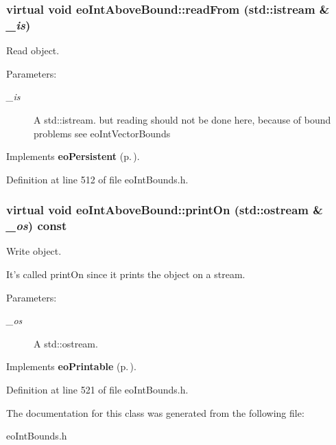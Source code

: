 \subsubsection{\setlength{\rightskip}{0pt plus 5cm}virtual void eo\-Int\-Above\-Bound::read\-From (std::istream \& {\em \_\-is})\hspace{0.3cm}{\tt  [inline, virtual]}}\label{classeo_int_above_bound_a14}


Read object. 

\begin{Desc}
\item[Parameters:]
\begin{description}
\item[{\em \_\-is}]A std::istream. but reading should not be done here, because of bound problems see eo\-Int\-Vector\-Bounds \end{description}
\end{Desc}


Implements {\bf eo\-Persistent} {\rm (p.\,\pageref{classeo_persistent_a1})}.

Definition at line 512 of file eo\-Int\-Bounds.h.
\subsubsection{\setlength{\rightskip}{0pt plus 5cm}virtual void eo\-Int\-Above\-Bound::print\-On (std::ostream \& {\em \_\-os}) const\hspace{0.3cm}{\tt  [inline, virtual]}}\label{classeo_int_above_bound_a15}


Write object. 

It's called print\-On since it prints the object on a stream. \begin{Desc}
\item[Parameters:]
\begin{description}
\item[{\em \_\-os}]A std::ostream. \end{description}
\end{Desc}


Implements {\bf eo\-Printable} {\rm (p.\,\pageref{classeo_printable_a1})}.

Definition at line 521 of file eo\-Int\-Bounds.h.

The documentation for this class was generated from the following file:\begin{CompactItemize}
\item 
eo\-Int\-Bounds.h\end{CompactItemize}
